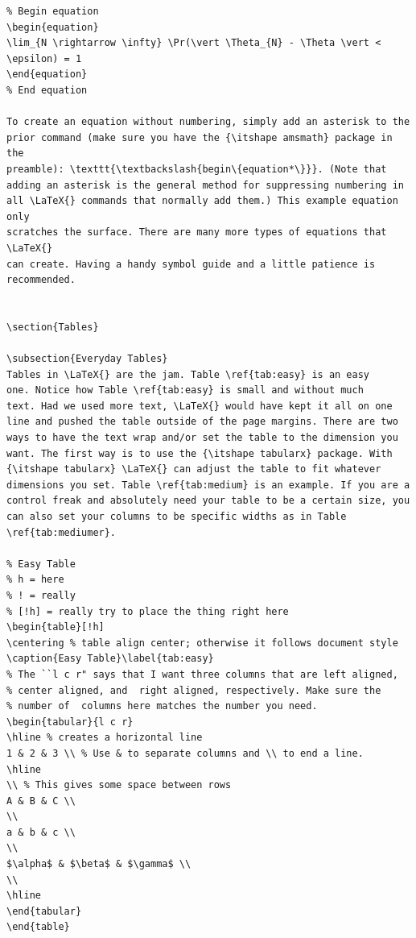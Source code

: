 \documentclass[12pt]{article}
\begin{document}
\begin{verbatim}
% Begin equation
\begin{equation}
\lim_{N \rightarrow \infty} \Pr(\vert \Theta_{N} - \Theta \vert < \epsilon) = 1
\end{equation}
% End equation

To create an equation without numbering, simply add an asterisk to the
prior command (make sure you have the {\itshape amsmath} package in the
preamble): \texttt{\textbackslash{begin\{equation*\}}}. (Note that
adding an asterisk is the general method for suppressing numbering in
all \LaTeX{} commands that normally add them.) This example equation only 
scratches the surface. There are many more types of equations that \LaTeX{} 
can create. Having a handy symbol guide and a little patience is recommended.


\section{Tables}

\subsection{Everyday Tables}
Tables in \LaTeX{} are the jam. Table \ref{tab:easy} is an easy
one. Notice how Table \ref{tab:easy} is small and without much
text. Had we used more text, \LaTeX{} would have kept it all on one
line and pushed the table outside of the page margins. There are two
ways to have the text wrap and/or set the table to the dimension you
want. The first way is to use the {\itshape tabularx} package. With
{\itshape tabularx} \LaTeX{} can adjust the table to fit whatever
dimensions you set. Table \ref{tab:medium} is an example. If you are a
control freak and absolutely need your table to be a certain size, you
can also set your columns to be specific widths as in Table \ref{tab:mediumer}.

% Easy Table
% h = here
% ! = really
% [!h] = really try to place the thing right here
\begin{table}[!h]
\centering % table align center; otherwise it follows document style
\caption{Easy Table}\label{tab:easy}
% The ``l c r" says that I want three columns that are left aligned,
% center aligned, and  right aligned, respectively. Make sure the
% number of  columns here matches the number you need.
\begin{tabular}{l c r}
\hline % creates a horizontal line
1 & 2 & 3 \\ % Use & to separate columns and \\ to end a line.
\hline
\\ % This gives some space between rows
A & B & C \\
\\
a & b & c \\
\\
$\alpha$ & $\beta$ & $\gamma$ \\
\\
\hline
\end{tabular}
\end{table}


\end{verbatim}
\end{document}

